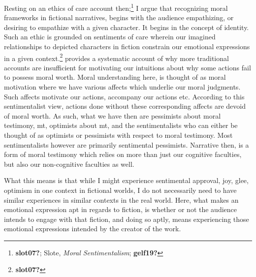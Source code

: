 \documentclass[
  12pt,
]{book}
\theoremstyle{definition}
\theoremstyle{definition}
\theoremstyle{definition}
\theoremstyle{definition}
\theoremstyle{remark}
\begin{document}
Resting on an ethics of care account then;\footnote{\textbf{slot07?}; Slote, \emph{Moral {Sentimentalism}}; \textbf{gelf19?}} I argue that recognizing moral frameworks in fictional narratives, begins with the audience empathizing, or desiring to empathize with a given character. It begins in the concept of identity. Such an ethic is grounded on sentiments of care wherein our imagined relationships to depicted characters in fiction constrain our emotional expressions in a given context.\footnote{\textbf{slot07?}} provides a systematic account of why more traditional accounts are insufficient for motivating our intuitions about why some actions fail to possess moral worth. Moral understanding here, is thought of as moral motivation where we have various affects which underlie our moral judgments. Such affects motivate our actions, accompany our actions etc. According to this sentimentalist view, actions done without these corresponding affects are devoid of moral worth. As such, what we have then are pessimists about moral testimony, mt, optimists about mt, and the sentimentalists who can either be thought of as optimists or pessimists with respect to moral testimony. Most sentimentalists however are primarily sentimental pessimists. Narrative then, is a form of moral testimony which relies on more than just our cognitive faculties, but also our non-cognitive faculties as well.

What this means is that while I might experience sentimental approval, joy, glee, optimism in one context in fictional worlds, I do not necessarily need to have similar experiences in similar contexts in the real world. Here, what makes an emotional expression apt in regards to fiction, is whether or not the audience intends to engage with that fiction, and doing so aptly, means experiencing those emotional expressions intended by the creator of the work.
\end{document}
